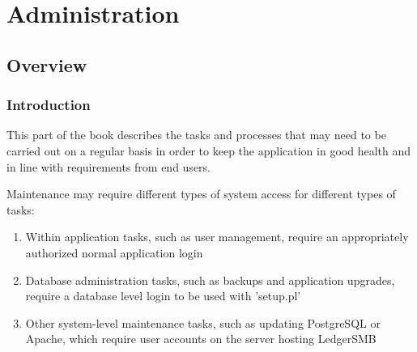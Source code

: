 

\part{Administration}
\label{part:Administration}

%

\chapter{Overview}
\label{cha:AdministrationOverview}

\section{Introduction}

This part of the book describes the tasks and processes that may need to be carried out
on a regular basis in order to keep the application in good health and in line with
requirements from end users.

Maintenance may require different types of system access for different types of tasks:

\begin{enumerate}
\item Within application tasks, such as user management, require an appropriately authorized
   normal application login
\item Database administration tasks, such as backups and application upgrades,
 require
   a database level login to be used with 'setup.pl'
\item Other system-level maintenance tasks, such as updating PostgreSQL or Apache, which
   require user accounts on the server hosting LedgerSMB
\end{enumerate}

